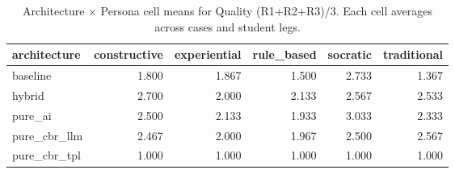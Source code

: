 \begin{table}[htbp]
\centering
\caption{Architecture × Persona cell means for Quality (R1+R2+R3)/3. Each cell averages across cases and student legs.}
\label{tab:cell-quality}
\begin{tabular}{lrrrrr}
\toprule
architecture & constructive & experiential & rule\_based & socratic & traditional \\
\midrule
baseline & 1.800 & 1.867 & 1.500 & 2.733 & 1.367 \\
hybrid & 2.700 & 2.000 & 2.133 & 2.567 & 2.533 \\
pure\_ai & 2.500 & 2.133 & 1.933 & 3.033 & 2.333 \\
pure\_cbr\_llm & 2.467 & 2.000 & 1.967 & 2.500 & 2.567 \\
pure\_cbr\_tpl & 1.000 & 1.000 & 1.000 & 1.000 & 1.000 \\
\bottomrule
\end{tabular}
\end{table}
